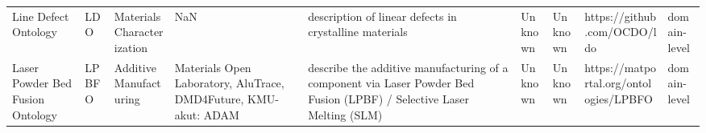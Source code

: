 \begin{tabular}{m{5cm}m{2cm}m{5cm}m{2cm}m{2cm}m{2cm}m{2cm}m{2cm}m{2cm}}
                                                             Line Defect Ontology &                     LDO &                  Materials Characterization &                                                                                                                                                                                                                                                                                                                                                                  NaN &                                                                                                                                                                                                                                                                                                                                                 description of linear defects in crystalline materials &                                                                                                            Unknown &                                      Unknown &                                                                        https://github.com/OCDO/ldo &      domain-level \\
                                                 Laser Powder Bed Fusion Ontology &                   LPBFO &                      Additive Manufacturing &                                                                                                                                                                                                                                                                                                      Materials Open Laboratory, AluTrace, DMD4Future, KMU-akut: ADAM &                                                                                                                                                                                                                                                                                  describe the additive manufacturing of a component via Laser Powder Bed Fusion (LPBF) / Selective Laser Melting (SLM) &                                                                                                            Unknown &                                      Unknown &                                                             https://matportal.org/ontologies/LPBFO &      domain-level \\

\end{tabular}
